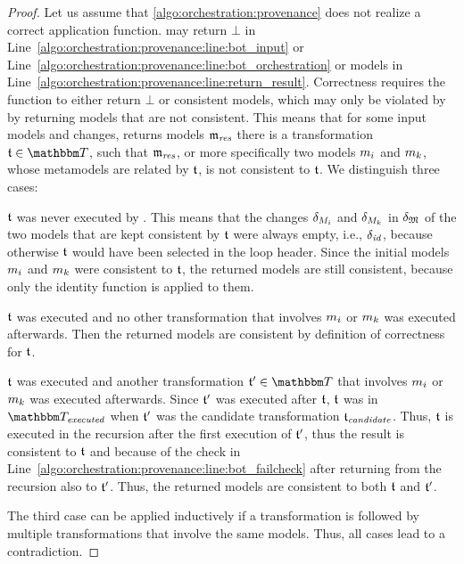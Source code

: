 \begin{proof}
    Let us assume that \autoref{algo:orchestration:provenance} does not realize a correct application function.
     may return $\bot$ in Line~\ref{algo:orchestration:provenance:line:bot_input} or Line~\ref{algo:orchestration:provenance:line:bot_orchestration} or models in Line~\ref{algo:orchestration:provenance:line:return_result}.
    Correctness requires the function to either return $\bot$ or consistent models, which may only be violated by  by returning models that are not consistent.
    This means that for some input models and changes,  returns models $\mathfrak{m}_{\mathit{res}}$ there is a transformation $\transformation{t} \in \transformationset{T}$, such that $\mathfrak{m}_{\mathit{res}}$, or more specifically two models $m_{i}$ and $m_{k}$, 
    whose metamodels are related by $\mathfrak{t}$, is not consistent to $\mathfrak{t}$.
    We distinguish three cases:
    \begin{longenumerate}
        \item $\mathfrak{t}$ was never executed by . This means that the changes $\delta_{M_{i}}$ and $\delta_{M_{k}}$ in $\delta_{\mathfrak{M}}$ of the two models that are kept consistent by $\mathfrak{t}$ were always empty, i.e., $\delta_{\mathit{id}}$, because otherwise $\mathfrak{t}$ would have been selected in the loop header. Since the initial models $m_{i}$ and $m_{k}$ were consistent to $\mathfrak{t}$, the returned models are still consistent, because only the identity function is applied to them.
        \item $\mathfrak{t}$ was executed and no other transformation that involves $m_{i}$ or $m_{k}$ was executed afterwards. Then the returned models are consistent by definition of correctness for $\mathfrak{t}$.
        \item $\mathfrak{t}$ was executed and another transformation $\transformation{t}' \in \transformationset{T}$ that involves $m_{i}$ or $m_{k}$ was executed afterwards.
        Since $\mathfrak{t}'$ was executed after $\mathfrak{t}$, $\mathfrak{t}$ was in $\provalgexecuted$ when $\mathfrak{t}'$ was the candidate transformation $\mathfrak{t}_{\mathit{candidate}}$.
        Thus, $\mathfrak{t}$ is executed in the recursion after the first execution of $\mathfrak{t}'$, thus the result is consistent to $\mathfrak{t}$ and because of the check in Line~\ref{algo:orchestration:provenance:line:bot_failcheck} after returning from the recursion also to $\mathfrak{t}'$. Thus, the returned models are consistent to both $\mathfrak{t}$ and $\mathfrak{t}'$.
    \end{longenumerate}
    The third case can be applied inductively if a transformation is followed by multiple transformations that involve the same models. Thus, all cases lead to a contradiction.
\end{proof}

